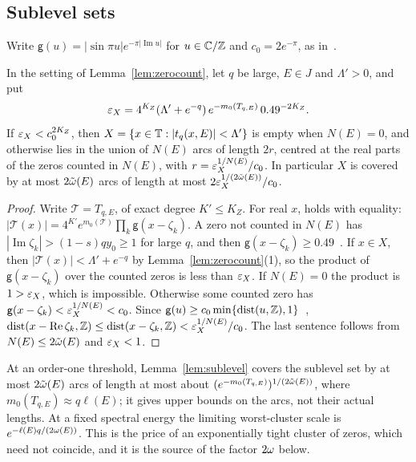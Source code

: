 \subsection{Sublevel sets}

Write $\mathsf g(u)=|\sin\pi u|e^{-\pi|\operatorname{Im}u|}$ for $u\in\mathbb C/\mathbb Z$ and $c_0=2e^{-\pi}$, as in~\cite[Section~7.2]{DMuniv}.

\begin{lemma}\label{lem:sublevel}
In the setting of Lemma~\ref{lem:zerocount}, let $q$ be large, $E\in J$ and $\Lambda'>0$, and put
\[
\varepsilon_X=4^{K_Z}(\Lambda'+e^{-q})\,e^{-m_0(T_{q,E})}\,0.49^{-2K_Z}.
\]
If $\varepsilon_X<c_0^{2K_Z}$, then $X=\{x\in\mathbb T:|t_q(x,E)|<\Lambda'\}$ is empty when $N(E)=0$, and otherwise lies in the union of $N(E)$ arcs of length $2r$, centred at the real parts of the zeros counted in $N(E)$, with $r=\varepsilon_X^{1/N(E)}/c_0$. In particular $X$ is covered by at most $2\tilde\omega(E)$ arcs of length at most $2\varepsilon_X^{1/(2\tilde\omega(E))}/c_0$.
\end{lemma}

\begin{proof}
Write $\mathcal T=T_{q,E}$, of exact degree $K'\le K_Z$. For real $x$, \cite[Lemma~7.3(3)]{DMuniv} holds with equality: $|\mathcal T(x)|=4^{K'}e^{m_0(\mathcal T)}\prod_k\mathsf g(x-\zeta_k)$. A zero not counted in $N(E)$ has $|\operatorname{Im}\zeta_k|>(1-s)qy_0\ge1$ for large $q$, and then $\mathsf g(x-\zeta_k)\ge0.49$~\cite[proof of Lemma~7.3(2)]{DMuniv}. If $x\in X$, then $|\mathcal T(x)|<\Lambda'+e^{-q}$ by Lemma~\ref{lem:zerocount}(1), so the product of $\mathsf g(x-\zeta_k)$ over the counted zeros is less than $\varepsilon_X$. If $N(E)=0$ the product is $1>\varepsilon_X$, which is impossible. Otherwise some counted zero has $\mathsf g(x-\zeta_k)<\varepsilon_X^{1/N(E)}<c_0$. Since $\mathsf g(u)\ge c_0\min\{\operatorname{dist}(u,\mathbb Z),1\}$~\cite[Lemma~7.3(2)]{DMuniv}, $\operatorname{dist}(x-\operatorname{Re}\zeta_k,\mathbb Z)\le\operatorname{dist}(x-\zeta_k,\mathbb Z)<\varepsilon_X^{1/N(E)}/c_0$. The last sentence follows from $N(E)\le2\tilde\omega(E)$ and $\varepsilon_X<1$.
\end{proof}

At an order-one threshold, Lemma~\ref{lem:sublevel} covers the sublevel set by at most $2\tilde\omega(E)$ arcs of length at most about $(e^{-m_0(T_{q,E})})^{1/(2\tilde\omega(E))}$, where $m_0(T_{q,E})\approx q\ell(E)$; it gives upper bounds on the arcs, not their actual lengths. At a fixed spectral energy the limiting worst-cluster scale is $e^{-\ell(E)q/(2\omega(E))}$. This is the price of an exponentially tight cluster of zeros, which need not coincide, and it is the source of the factor $2\omega$ below.
